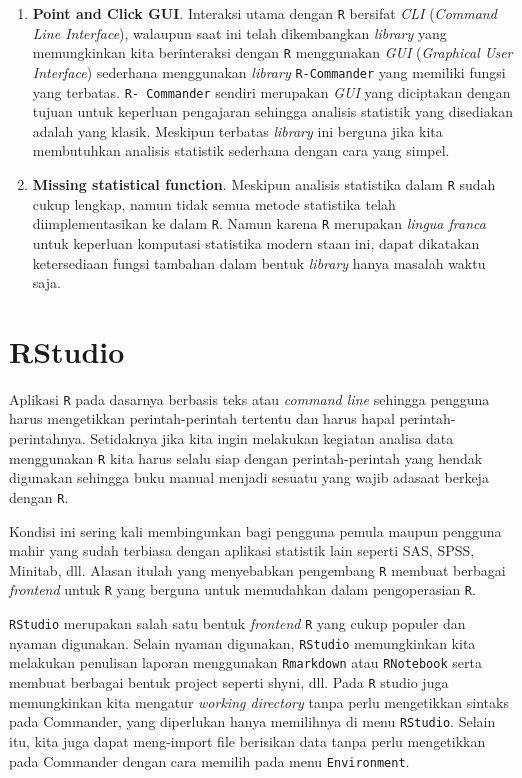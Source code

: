 \documentclass[]{book}
\providecommand{\tightlist}{%
  \setlength{\itemsep}{0pt}\setlength{\parskip}{0pt}}
\theoremstyle{definition}
\theoremstyle{definition}
\theoremstyle{definition}
\theoremstyle{remark}
\begin{document}
\begin{enumerate}
\def\labelenumi{\arabic{enumi}.}
\tightlist
\item
  \textbf{Point and Click GUI}. Interaksi utama dengan \texttt{R} bersifat \emph{CLI} (\emph{Command Line Interface}), walaupun saat ini telah dikembangkan \emph{library} yang memungkinkan kita berinteraksi dengan \texttt{R} menggunakan \emph{GUI} (\emph{Graphical User Interface}) sederhana menggunakan \emph{library} \texttt{R-Commander} yang memiliki fungsi yang terbatas. \texttt{R-\ Commander} sendiri merupakan \emph{GUI} yang diciptakan dengan tujuan untuk keperluan pengajaran sehingga analisis statistik yang disediakan adalah yang klasik. Meskipun terbatas \emph{library} ini berguna jika kita membutuhkan analisis statistik sederhana dengan cara yang simpel.
\item
  \textbf{Missing statistical function}. Meskipun analisis statistika dalam \texttt{R} sudah cukup lengkap, namun tidak semua metode statistika telah diimplementasikan ke dalam \texttt{R}. Namun karena \texttt{R} merupakan \emph{lingua franca} untuk keperluan komputasi statistika modern staan ini, dapat dikatakan ketersediaan fungsi tambahan dalam bentuk \emph{library} hanya masalah waktu saja.
\end{enumerate}

\hypertarget{rstudio}{%
\section{RStudio}\label{rstudio}}

Aplikasi \texttt{R} pada dasarnya berbasis teks atau \emph{command line} sehingga pengguna harus mengetikkan perintah-perintah tertentu dan harus hapal perintah-perintahnya. Setidaknya jika kita ingin melakukan kegiatan analisa data menggunakan \texttt{R} kita harus selalu siap dengan perintah-perintah yang hendak digunakan sehingga buku manual menjadi sesuatu yang wajib adasaat berkeja dengan \texttt{R}.

Kondisi ini sering kali membingunkan bagi pengguna pemula maupun pengguna mahir yang sudah terbiasa dengan aplikasi statistik lain seperti SAS, SPSS, Minitab, dll. Alasan itulah yang menyebabkan pengembang \texttt{R} membuat berbagai \emph{frontend} untuk \texttt{R} yang berguna untuk memudahkan dalam pengoperasian \texttt{R}.

\texttt{RStudio} merupakan salah satu bentuk \emph{frontend} \texttt{R} yang cukup populer dan nyaman digunakan. Selain nyaman digunakan, \texttt{RStudio} memungkinkan kita melakukan penulisan laporan menggunakan \texttt{Rmarkdown} atau \texttt{RNotebook} serta membuat berbagai bentuk project seperti shyni, dll. Pada \texttt{R} studio juga memungkinkan kita mengatur \emph{working directory} tanpa perlu mengetikkan sintaks pada Commander, yang diperlukan hanya memilihnya di menu \texttt{RStudio}. Selain itu, kita juga dapat meng-import file berisikan data tanpa perlu mengetikkan pada Commander dengan cara memilih pada menu \texttt{Environment}.
\end{document}
